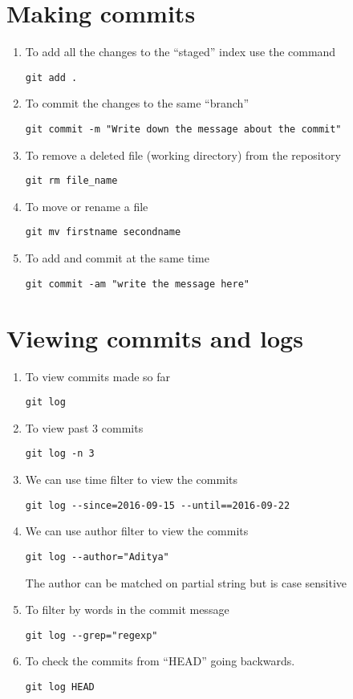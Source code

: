 \documentclass[paper=a4, fontsize=12pt]{scrartcl}
\begin{document}
\section*{Making commits}
\begin{enumerate}
\item To add all the changes to the ``staged'' index use the command
\begin{lstlisting}
git add .
\end{lstlisting}
\item To commit the changes to the same ``branch''
\begin{lstlisting}
git commit -m "Write down the message about the commit"
\end{lstlisting}
\item To remove a deleted file (working directory) from the repository
\begin{lstlisting}
git rm file_name
\end{lstlisting}
\item To move or rename a file
\begin{lstlisting}
git mv firstname secondname
\end{lstlisting}
\item To add and commit at the same time
\begin{lstlisting}
git commit -am "write the message here"
\end{lstlisting}
\end{enumerate}

\section*{Viewing commits and logs}
\begin{enumerate}
\item To view commits made so far
\begin{lstlisting}
git log
\end{lstlisting}
\item To view past $3$ commits
\begin{lstlisting}
git log -n 3
\end{lstlisting}
\item We can use time filter to view the commits
\begin{lstlisting}
git log --since=2016-09-15 --until==2016-09-22
\end{lstlisting}
\item We can use author filter to view the commits
\begin{lstlisting}
git log --author="Aditya"
\end{lstlisting}
The author can be matched on partial string but is case sensitive
\item To filter by words in the commit message
\begin{lstlisting}
git log --grep="regexp"
\end{lstlisting}
\item To check the commits from ``HEAD'' going backwards.
\begin{lstlisting}
git log HEAD
\end{lstlisting}
\end{enumerate}
\end{document}
